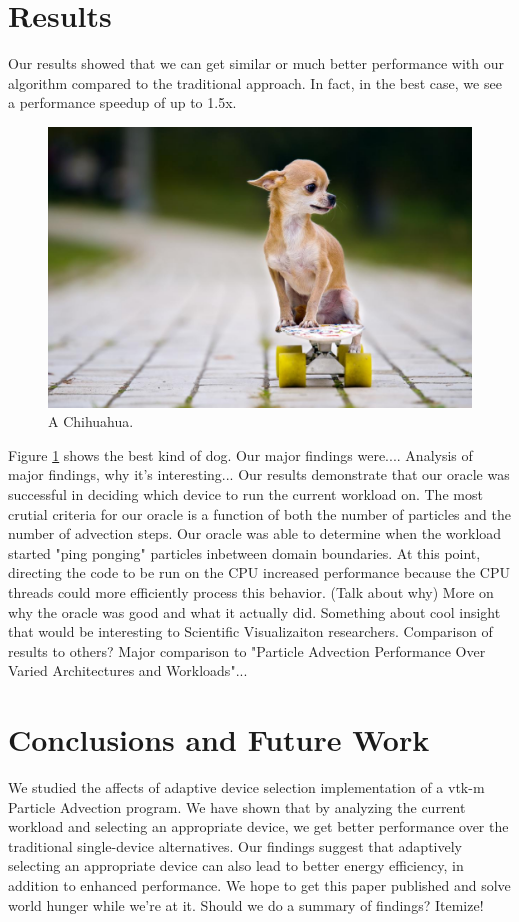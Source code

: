 \documentclass{IEEEtran}
\begin{document}
\section{Results}
Our results showed that we can get similar or much better performance with our algorithm compared to the traditional approach. 
%
In fact, in the best case, we see a performance speedup of up to 1.5x.
%
\begin{figure}
  \includegraphics[width=\linewidth]{chichi.jpg}
  \caption{A Chihuahua.}
  \label{fig:chichi}
\end{figure}
%
Figure \ref{fig:chichi} shows the best kind of dog.
%
Our major findings were....
%
Analysis of major findings, why it's interesting...
%
Our results demonstrate that our oracle was successful in deciding which device to run the current workload on.
%
The most crutial criteria for our oracle is a function of both the number of particles and the number of advection steps.
%
Our oracle was able to determine when the workload started "ping ponging" particles inbetween domain boundaries.
%
At this point, directing the code to be run on the CPU increased performance because the CPU threads could more efficiently process this behavior. (Talk about why)
%
More on why the oracle was good and what it actually did.
%
Something about cool insight that would be interesting to Scientific Visualizaiton researchers.
%
Comparison of results to others? 
%
Major comparison to "Particle Advection Performance Over Varied Architectures and Workloads"...
%
\section{Conclusions and Future Work}
We studied the affects of adaptive device selection implementation of a vtk-m Particle Advection program. 
%
We have shown that by analyzing the current workload and selecting an appropriate device, we get better performance over the traditional single-device alternatives. 
%
Our findings suggest that adaptively selecting an appropriate device can also lead to better energy efficiency, in addition to enhanced performance. 
%
We hope to get this paper published and solve world hunger while we're at it.
%
Should we do a summary of findings? Itemize!
\end{document}
